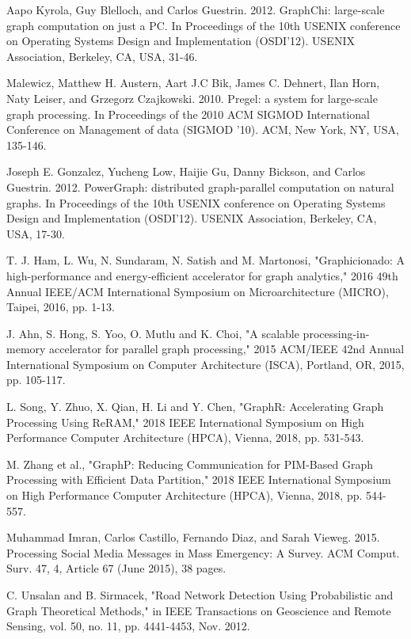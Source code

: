 \documentclass[conference,compsoc]{IEEEtran}
\begin{document}
\begin{thebibliography}{10}

 Aapo Kyrola, Guy Blelloch, and Carlos Guestrin. 2012. GraphChi: large-scale graph computation on just a PC. In Proceedings of the 10th USENIX conference on Operating Systems Design and Implementation (OSDI'12). USENIX Association, Berkeley, CA, USA, 31-46.

 Malewicz, Matthew H. Austern, Aart J.C Bik, James C. Dehnert, Ilan Horn, Naty Leiser, and Grzegorz Czajkowski. 2010. Pregel: a system for large-scale graph processing. In Proceedings of the 2010 ACM SIGMOD International Conference on Management of data (SIGMOD '10). ACM, New York, NY, USA, 135-146.

 Joseph E. Gonzalez, Yucheng Low, Haijie Gu, Danny Bickson, and Carlos Guestrin. 2012. PowerGraph: distributed graph-parallel computation on natural graphs. In Proceedings of the 10th USENIX conference on Operating Systems Design and Implementation (OSDI'12). USENIX Association, Berkeley, CA, USA, 17-30.

 T. J. Ham, L. Wu, N. Sundaram, N. Satish and M. Martonosi, "Graphicionado: A high-performance and energy-efficient accelerator for graph analytics," 2016 49th Annual IEEE/ACM International Symposium on Microarchitecture (MICRO), Taipei, 2016, pp. 1-13.

J. Ahn, S. Hong, S. Yoo, O. Mutlu and K. Choi, "A scalable processing-in-memory accelerator for parallel graph processing," 2015 ACM/IEEE 42nd Annual International Symposium on Computer Architecture (ISCA), Portland, OR, 2015, pp. 105-117.

 L. Song, Y. Zhuo, X. Qian, H. Li and Y. Chen, "GraphR: Accelerating Graph Processing Using ReRAM," 2018 IEEE International Symposium on High Performance Computer Architecture (HPCA), Vienna, 2018, pp. 531-543.

 M. Zhang et al., "GraphP: Reducing Communication for PIM-Based Graph Processing with Efficient Data Partition," 2018 IEEE International Symposium on High Performance Computer Architecture (HPCA), Vienna, 2018, pp. 544-557.

 Muhammad Imran, Carlos Castillo, Fernando Diaz, and Sarah Vieweg. 2015. Processing Social Media Messages in Mass Emergency: A Survey. ACM Comput. Surv. 47, 4, Article 67 (June 2015), 38 pages. 

 C. Unsalan and B. Sirmacek, "Road Network Detection Using Probabilistic and Graph Theoretical Methods," in IEEE Transactions on Geoscience and Remote Sensing, vol. 50, no. 11, pp. 4441-4453, Nov. 2012.


\end{thebibliography}
\end{document}
